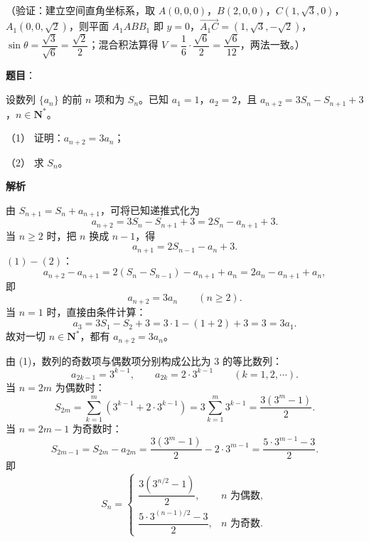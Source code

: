 \begin{answer}
（验证：建立空间直角坐标系，取 \(A(0,0,0)\)，\(B(2,0,0)\)，\(C(1,\sqrt3,0)\)，\(A_1(0,0,\sqrt2)\)，则平面 \(A_1ABB_1\) 即 \(y=0\)，\(\overrightarrow{A_1C}=(1,\sqrt3,-\sqrt2)\)，\(\sin\theta=\dfrac{\sqrt3}{\sqrt6}=\dfrac{\sqrt2}{2}\)；混合积法算得 \(V=\dfrac16\cdot\dfrac{\sqrt6}{2}=\dfrac{\sqrt6}{12}\)，两法一致。）



\end{answer}
\begin{answer}

\textbf{题目}：

设数列 \(\{a_n\}\) 的前 \(n\) 项和为 \(S_n\)。已知 \(a_1=1\)，\(a_2=2\)，且 \(a_{n+2}=3S_n-S_{n+1}+3\)，\(n\in\mathbf{N}^*\)。

（1） 证明：\(a_{n+2}=3a_n\)；

（2） 求 \(S_n\)。

\textbf{解析}


由 \(S_{n+1}=S_n+a_{n+1}\)，可将已知递推式化为
\nopagebreak[4]
\[
a_{n+2}=3S_n-S_{n+1}+3=2S_n-a_{n+1}+3. \tag{1}
\]
当 \(n\geqslant2\) 时，把 \(n\) 换成 \(n-1\)，得
\nopagebreak[4]
\[
a_{n+1}=2S_{n-1}-a_n+3. \tag{2}
\]
\((1)-(2)\)：
\nopagebreak[4]
\[
a_{n+2}-a_{n+1}=2(S_n-S_{n-1})-a_{n+1}+a_n=2a_n-a_{n+1}+a_n,
\]
即
\nopagebreak[4]
\[
a_{n+2}=3a_n\qquad(n\geqslant2).
\]
当 \(n=1\) 时，直接由条件计算：
\nopagebreak[4]
\[
a_3=3S_1-S_2+3=3\cdot1-(1+2)+3=3=3a_1.
\]
故对一切 \(n\in\mathbf{N}^*\)，都有 \(a_{n+2}=3a_n\)。


由 (1)，数列的奇数项与偶数项分别构成公比为 \(3\) 的等比数列：
\nopagebreak[4]
\[
a_{2k-1}=3^{k-1},\qquad a_{2k}=2\cdot3^{k-1}\qquad(k=1,2,\cdots).
\]
当 \(n=2m\) 为偶数时：
\nopagebreak[4]
\[
S_{2m}=\sum_{k=1}^{m}\left(3^{k-1}+2\cdot3^{k-1}\right)
=3\sum_{k=1}^{m}3^{k-1}
=\dfrac{3(3^m-1)}{2}.
\]
当 \(n=2m-1\) 为奇数时：
\nopagebreak[4]
\[
S_{2m-1}=S_{2m}-a_{2m}
=\dfrac{3(3^m-1)}{2}-2\cdot3^{m-1}
=\dfrac{5\cdot3^{m-1}-3}{2}.
\]
即
\nopagebreak[4]
\[
S_n=\begin{cases}
\dfrac{3\left(3^{n/2}-1\right)}{2}, & n\text{ 为偶数},\\[6pt]
\dfrac{5\cdot3^{(n-1)/2}-3}{2}, & n\text{ 为奇数}.
\end{cases}
\]


\end{answer}
